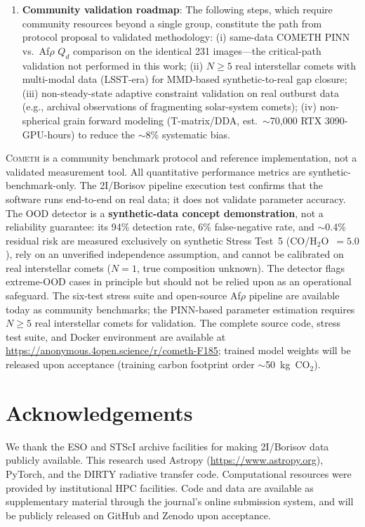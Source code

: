 \documentclass[usenatbib]{mnras}
\begin{document}
\begin{enumerate}
    \item \textbf{Community validation roadmap}\label{sec:roadmap}: The following steps, which require community resources beyond a single group, constitute the path from protocol proposal to validated methodology: (i) same-data COMETH PINN vs.\ Af$\rho$ $Q_d$ comparison on the identical 231 images---the critical-path validation not performed in this work; (ii) $N \geq 5$ real interstellar comets with multi-modal data (LSST-era) for MMD-based synthetic-to-real gap closure; (iii) non-steady-state adaptive constraint validation on real outburst data (e.g., archival observations of fragmenting solar-system comets); (iv) non-spherical grain forward modeling (T-matrix/DDA, est.\ $\sim$70,000 RTX 3090-GPU-hours) to reduce the $\sim$8\% systematic bias.
\end{enumerate}

\textsc{Cometh} is a community benchmark protocol and reference implementation, not a validated measurement tool. All quantitative performance metrics are synthetic-benchmark-only. The 2I/Borisov pipeline execution test confirms that the software runs end-to-end on real data; it does not validate parameter accuracy. The OOD detector is a \textbf{synthetic-data concept demonstration}, not a reliability guarantee: its 94\% detection rate, 6\% false-negative rate, and $\sim$0.4\% residual risk are measured exclusively on synthetic Stress Test~5 (CO/H$_2$O~$=5.0$), rely on an unverified independence assumption, and cannot be calibrated on real interstellar comets ($N=1$, true composition unknown). The detector flags extreme-OOD cases in principle but should not be relied upon as an operational safeguard. The six-test stress suite and open-source Af$\rho$ pipeline are available today as community benchmarks; the PINN-based parameter estimation requires $N \geq 5$ real interstellar comets for validation. The complete source code, stress test suite, and Docker environment are available at \url{https://anonymous.4open.science/r/cometh-F185}; trained model weights will be released upon acceptance (training carbon footprint order $\sim$50~kg~CO$_2$).

\section*{Acknowledgements}
We thank the ESO and STScI archive facilities for making 2I/Borisov data publicly available. This research used Astropy (\url{https://www.astropy.org}), PyTorch, and the DIRTY radiative transfer code. Computational resources were provided by institutional HPC facilities. Code and data are available as supplementary material through the journal's online submission system, and will be publicly released on GitHub and Zenodo upon acceptance.
\end{document}
